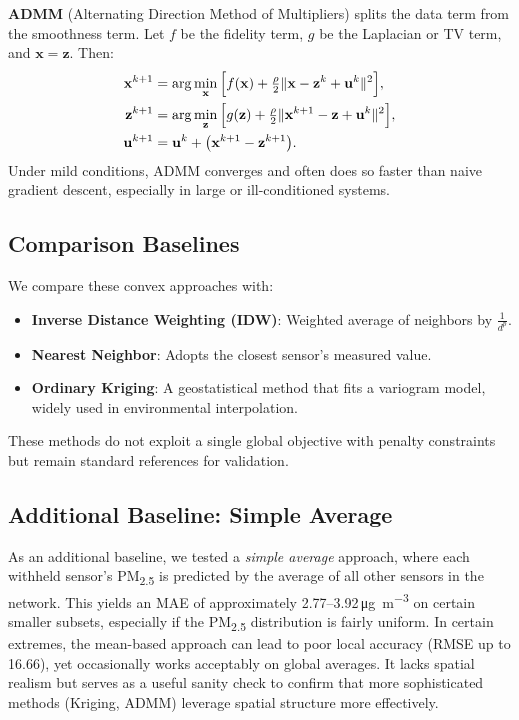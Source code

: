 \documentclass[12pt]{article}                                %
\begin{document}
\textbf{ADMM} (Alternating Direction Method of Multipliers) splits the data term from the 
smoothness term. Let $f$ be the fidelity term, $g$ be the Laplacian or TV term, and $\mathbf{x} 
= \mathbf{z}$. Then:
\[
\begin{aligned}
\mathbf{x}^{k+1} &= \arg\min_\mathbf{x}\,\Bigl[f(\mathbf{x}) + \tfrac{\rho}{2}\|\mathbf{x}-\mathbf{z}^k 
+ \mathbf{u}^k\|^2\Bigr],\\
\mathbf{z}^{k+1} &= \arg\min_\mathbf{z}\,\Bigl[g(\mathbf{z}) + \tfrac{\rho}{2}\|\mathbf{x}^{k+1}-\mathbf{z}
+\mathbf{u}^k\|^2\Bigr],\\
\mathbf{u}^{k+1} &= \mathbf{u}^k + \bigl(\mathbf{x}^{k+1} - \mathbf{z}^{k+1}\bigr).
\end{aligned}
\]
Under mild conditions, ADMM converges \cite{BoydADMM} and often does so faster than naive 
gradient descent, especially in large or ill-conditioned systems.

\subsection{Comparison Baselines}
\label{sec:comparison_baselines}   %
We compare these convex approaches with:
\begin{itemize}
    \item \textbf{Inverse Distance Weighting (IDW)}: Weighted average of neighbors by $\tfrac{1}{d^p}$.
    \item \textbf{Nearest Neighbor}: Adopts the closest sensor's measured value.
    \item \textbf{Ordinary Kriging}: A geostatistical method that fits a variogram model, widely 
    used in environmental interpolation. 
\end{itemize}
These methods do not exploit a single global objective with penalty constraints but remain 
standard references for validation.

\subsection{Additional Baseline: Simple Average}
\label{sec:baselineSimpleAvg}   %

As an additional baseline, we tested a \emph{simple average} approach, 
where each withheld sensor's PM\textsubscript{2.5} is predicted by the average of all other 
sensors in the network. This yields an MAE of approximately 2.77--3.92\,\si{\micro\gram\per\cubic\meter} 
on certain smaller subsets, especially if the PM\textsubscript{2.5} distribution is fairly uniform. 
In certain extremes, the mean-based approach can lead to poor local accuracy (RMSE up to 16.66), 
yet occasionally works acceptably on global averages. It lacks spatial realism but serves as a 
useful sanity check to confirm that more sophisticated methods (Kriging, ADMM) leverage spatial 
structure more effectively.
\end{document}

